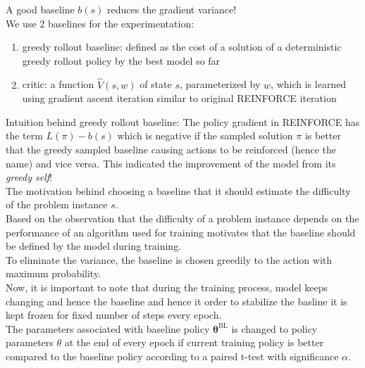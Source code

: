 \documentclass{article}
\theoremstyle{definition}
\begin{document}
A good baseline $b(s)$ reduces the gradient variance!\\
We use 2 baselines for the experimentation:
\begin{enumerate}
    \item greedy rollout baseline: defined as the cost of a solution of a deterministic greedy rollout policy by the best model so far
    \item critic: a function $\hat{V}(s,w)$ of state $s$, parameterized by $w$, which is learned using gradient ascent iteration similar to original REINFORCE iteration
\end{enumerate}
Intuition behind greedy rollout baseline: The policy gradient in REINFORCE has the term $L(\pi)-b(s)$ which is negative if the sampled solution $\pi$ is better that the greedy sampled baseline causing actions to be reinforced (hence the name) and vice versa. This indicated the improvement of the model from its \emph{greedy self}!
\\

The motivation behind choosing a baseline that it should estimate the difficulty of the problem instance $s$. \\
Based on the observation that the difficulty of a problem instance depends on the performance of an algorithm used for training motivates that the baseline should be defined by the model during training. \\
To eliminate the variance, the baseline is chosen greedily to the action with maximum probability. \\

Now, it is important to note that during the training process, model keeps changing and hence the baseline and hence it order to stabilize the basline it is kept frozen for fixed number of steps every epoch.\\
    The parameters associated with baseline policy $\bm{\theta}^{\text{BL}}$ is changed to policy parameters $\theta$ at the end of every epoch if current training policy is better compared to the baseline policy according to a paired t-test with significance $\alpha$.\\
    
\end{document}
